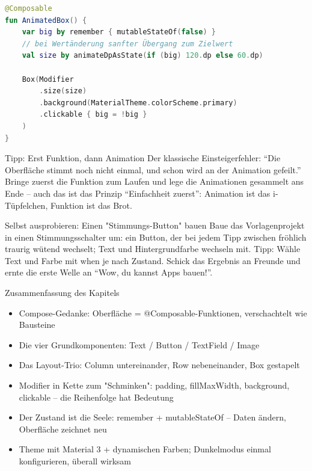 \begin{lstlisting}[language=Kotlin]
@Composable
fun AnimatedBox() {
    var big by remember { mutableStateOf(false) }
    // bei Wertänderung sanfter Übergang zum Zielwert
    val size by animateDpAsState(if (big) 120.dp else 60.dp)

    Box(Modifier
        .size(size)
        .background(MaterialTheme.colorScheme.primary)
        .clickable { big = !big }
    )
}
\end{lstlisting}

\begin{tcbinfo}{Tipp: Erst Funktion, dann Animation}
Der klassische Einsteigerfehler: “Die Oberfläche stimmt noch nicht einmal, und schon wird an der Animation gefeilt.” Bringe zuerst die Funktion zum Laufen und lege die Animationen gesammelt ans Ende – auch das ist das Prinzip “Einfachheit zuerst”: Animation ist das i-Tüpfelchen, Funktion ist das Brot.

\end{tcbinfo}

\begin{tcbpractice}{Selbst ausprobieren: Einen "Stimmungs-Button" bauen}
Baue das Vorlagenprojekt in einen Stimmungsschalter um: ein Button, der bei jedem Tipp zwischen fröhlich traurig wütend wechselt; Text und Hintergrundfarbe wechseln mit. Tipp: Wähle Text und Farbe mit when je nach Zustand. Schick das Ergebnis an Freunde und ernte die erste Welle an “Wow, du kannst Apps bauen!”.

\end{tcbpractice}

\begin{tcbsummary}{Zusammenfassung des Kapitels}
\begin{itemize}
  \item Compose-Gedanke: Oberfläche = @Composable-Funktionen, verschachtelt wie Bausteine
  \item Die vier Grundkomponenten: Text / Button / TextField / Image
  \item Das Layout-Trio: Column untereinander, Row nebeneinander, Box gestapelt
  \item Modifier in Kette zum "Schminken": padding, fillMaxWidth, background, clickable – die Reihenfolge hat Bedeutung
  \item Der Zustand ist die Seele: remember + mutableStateOf – Daten ändern, Oberfläche zeichnet neu
  \item Theme mit Material 3 + dynamischen Farben; Dunkelmodus einmal konfigurieren, überall wirksam
\end{itemize}

\end{tcbsummary}
